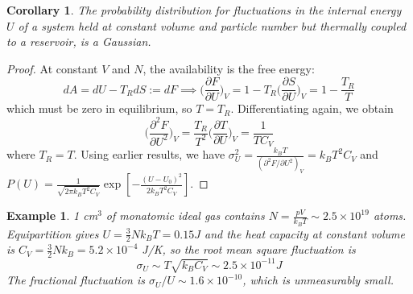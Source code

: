 \documentclass[a4paper]{article}
\newtheorem{eg}{Example}[section]
\theoremstyle{new}
\newtheorem{cor}{Corollary}[section]
\begin{document}
\begin{cor}
The probability distribution for fluctuations in the internal energy $U$ of a system held at constant volume and particle number but thermally coupled to a reservoir, is a Gaussian.
\end{cor}
\begin{proof}
At constant $V$ and $N$, the availability is the free energy:
$$dA=dU-T_RdS:=dF\implies\bigg(\frac{\partial F}{\partial U}\bigg)_V=1-T_R\bigg(\frac{\partial S}{\partial U}\bigg)_V=1-\frac{T_R}{T}$$
which must be zero in equilibrium, so $T=T_R$. Differentiating again, we obtain
$$\bigg(\frac{\partial^2F}{\partial U^2}\bigg)_V=\frac{T_R}{T^2}\bigg(\frac{\partial T}{\partial U}\bigg)_V=\frac{1}{TC_V}$$
where $T_R=T$. Using earlier results, we have $\sigma_U^2=\frac{k_BT}{(\partial^2F/\partial U^2)_V}=k_BT^2C_V$ and $P(U)=\frac{1}{\sqrt{2\pi k_BT^2C_V}}\exp[-\frac{(U-U_0)^2}{2k_BT^2C_V}]$.
\end{proof}
\begin{eg}
1 cm$^3$ of monatomic ideal gas contains $N=\frac{pV}{k_BT}\sim 2.5\times10^{19}$ atoms. Equipartition gives $U=\frac{3}{2}Nk_BT=0.15J$ and the heat capacity at constant volume is $C_V=\frac{3}{2}Nk_B=5.2\times10^{-4}$ J/K, so the root mean square fluctuation is
$$\sigma_U\sim T\sqrt{k_BC_V}\sim 2.5\times10^{-11}J$$
The fractional fluctuation is $\sigma_U/U\sim 1.6\times10^{-10}$, which is unmeasurably small. 
\end{eg}
\end{document}
